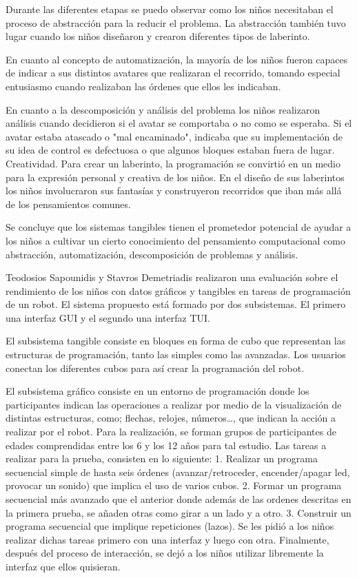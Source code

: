 Durante las diferentes etapas se puedo observar como los niños necesitaban el proceso de abstracción para la reducir el problema. La abstracción también tuvo lugar cuando los niños diseñaron y crearon diferentes tipos de laberinto. 

En cuanto al concepto de automatización, la mayoría de los niños fueron capaces de indicar a sus distintos avatares que realizaran el recorrido, tomando especial entusiasmo cuando realizaban las órdenes que ellos les indicaban. 

En cuanto a la descomposición y análisis del problema los niños realizaron análisis cuando decidieron si el avatar se comportaba o no como se esperaba. Si el avatar estaba atascado o "mal encaminado", indicaba que su implementación de su idea de control es defectuosa o que algunos bloques estaban fuera de lugar. Creatividad. Para crear un laberinto, la programación se convirtió en un medio para la expresión personal y creativa de los niños. En el diseño de sus laberintos los niños involucraron sus fantasías y construyeron recorridos que iban más allá de los pensamientos comunes.

Se concluye que los sistemas tangibles tienen el prometedor potencial de ayudar a los niños a cultivar un cierto conocimiento del pensamiento computacional como abstracción, automatización, descomposición de problemas y análisis.

Teodosios Sapounidis y Stavros Demetriadis \cite{Sapounidis} realizaron una evaluación sobre el rendimiento de los niños con datos gráficos y tangibles en tareas de programación de un robot. El sistema propuesto está formado por dos subsistemas. El primero una interfaz GUI y el segundo una interfaz TUI.

El subsistema tangible consiste en bloques en forma de cubo que representan las estructuras de programación, tanto las simples como las avanzadas. Los usuarios conectan los diferentes cubos para así crear la programación del robot.

El subsistema gráfico consiste en un entorno de programación donde los participantes indican las operaciones a realizar por medio de la visualización de distintas estructuras, como; flechas, relojes, números…, que indican la acción a realizar por el robot.
Para la realización, se forman grupos de participantes de edades comprendidas entre los 6 y los 12 años para tal estudio.
Las tareas a realizar para la prueba, consisten en lo siguiente:
1. Realizar un programa secuencial simple de hasta seis órdenes (avanzar/retroceder, encender/apagar led, provocar un sonido) que implica el uso de varios cubos.
2. Formar un programa secuencial más avanzado que el anterior donde además de las ordenes descritas en la primera prueba, se añaden otras como girar a un lado y a otro.
3. Construir un programa secuencial que implique repeticiones (lazos).
Se les pidió a los niños realizar dichas tareas primero con una interfaz y luego con otra. Finalmente, después del proceso de interacción, se dejó a los niños utilizar libremente la interfaz que ellos quisieran. 

